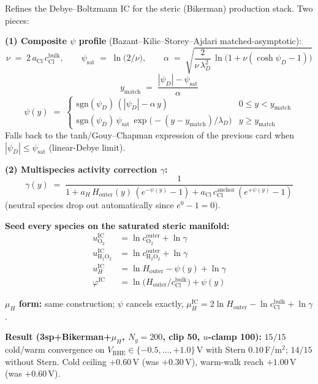 \documentclass[11pt]{article}
\newcommand{\VRHE}{V_{\mathrm{RHE}}}
\begin{document}
\begin{tcolorbox}[cardstyle={Bikerman-consistent IC (Option 2b, May 4)}]
Refines the Debye--Boltzmann IC for the steric (Bikerman) production
stack. Two pieces:

\textbf{(1) Composite \(\psi\) profile}
(Bazant--Kilic--Storey--Ajdari matched-asymptotic):
\[
  \nu \;=\; 2\,a_{\mathrm{Cl}}\,c_{\mathrm{Cl}}^{\mathrm{bulk}},\qquad
  \psi_{\mathrm{sat}} \;=\; \ln\!\bigl(2/\nu\bigr),\qquad
  \alpha \;=\; \sqrt{\frac{2}{\nu\,\lambda_D^{2}}\,
    \ln\!\bigl(1 + \nu(\cosh\psi_D - 1)\bigr)}
\]
\[
  y_{\mathrm{match}} \;=\; \frac{|\psi_D| - \psi_{\mathrm{sat}}}{\alpha}
\]
\[
  \psi(y) \;=\;
  \begin{cases}
    \mathrm{sgn}(\psi_D)\,(|\psi_D| - \alpha\,y)
       & 0 \le y < y_{\mathrm{match}} \\[3pt]
    \mathrm{sgn}(\psi_D)\,\psi_{\mathrm{sat}}\,
        \exp\!\bigl(-(y - y_{\mathrm{match}})/\lambda_D\bigr)
       & y \ge y_{\mathrm{match}}
  \end{cases}
\]
Falls back to the tanh/Gouy--Chapman expression of the previous card
when \(|\psi_D| \le \psi_{\mathrm{sat}}\) (linear-Debye limit).

\textbf{(2) Multispecies activity correction \(\gamma\):}
\[
  \gamma(y) \;=\;
  \frac{1}{1 + a_H\,H_{\mathrm{outer}}(y)\,(e^{-\psi(y)} - 1)
            + a_{\mathrm{Cl}}\,c_{\mathrm{Cl}}^{\mathrm{anchor}}\,
                              (e^{+\psi(y)} - 1)}
\]
(neutral species drop out automatically since \(e^{0}-1=0\)).

\textbf{Seed every species on the saturated steric manifold:}
\begin{align*}
  u_{\mathrm{O_2}}^{\mathrm{IC}}   &= \ln c_{\mathrm{O_2}}^{\mathrm{outer}}   + \ln\gamma\\
  u_{\mathrm{H_2O_2}}^{\mathrm{IC}} &= \ln c_{\mathrm{H_2O_2}}^{\mathrm{outer}} + \ln\gamma\\
  u_{H}^{\mathrm{IC}}    &= \ln H_{\mathrm{outer}} - \psi(y) + \ln\gamma\\
  \varphi^{\mathrm{IC}}  &= \ln\!\bigl(H_{\mathrm{outer}} / c_{\mathrm{Cl}}^{\mathrm{bulk}}\bigr) + \psi(y)
\end{align*}

\textbf{$\mu_H$ form:} same construction; \(\psi\) cancels exactly,
\(\mu_H^{\mathrm{IC}} = 2\ln H_{\mathrm{outer}} - \ln c_{\mathrm{Cl}}^{\mathrm{bulk}} + \ln\gamma\).

\textbf{Result (3sp+Bikerman+\(\mu_H\), \(N_y=200\), clip 50, \(u\)-clamp 100):}
\(15/15\) cold/warm convergence on
\(\VRHE\in\{-0.5,\dots,+1.0\}\,\)V with Stern \(0.10\,\)F/m\(^{2}\);
\(14/15\) without Stern. Cold ceiling \(+0.60\,\)V (was \(+0.30\,\)V),
warm-walk reach \(+1.00\,\)V (was \(+0.60\,\)V).
\end{tcolorbox}
\end{document}
